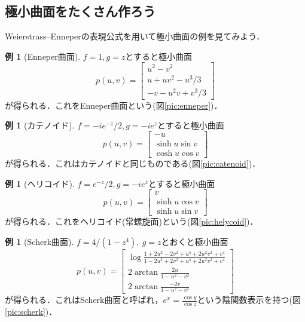 \documentclass[a4j]{ltjsarticle}
\numberwithin{equation}{section}
\theoremstyle{definition}
\newtheorem{eg}[thm]{例}
\begin{document}
\subsection{極小曲面をたくさん作ろう}
Weierstrass--Enneperの表現公式を用いて極小曲面の例を見てみよう．
\begin{eg}[Enneper曲面]
    $f=1,g=z$とすると極小曲面
    \begin{equation}
        p(u,v)=\begin{bmatrix}
            u^2-v^2\\
            u+uv^2-u^3/3\\
            -v-u^2v+v^3/3
        \end{bmatrix}
    \end{equation}
    が得られる．これをEnneper曲面という(図\ref{pic:enneper})．
\end{eg}
\begin{eg}[カテノイド]
    $f=-ie^{-z}/2,g=-ie^{z}$とすると極小曲面
    \begin{equation}
        p(u,v)=\begin{bmatrix}
            -u\\
            \sinh u \sin v\\
            \cosh u \cos v
        \end{bmatrix}
    \end{equation}
    が得られる．これはカテノイドと同じものである(図\ref{pic:catenoid})．
\end{eg}
\begin{eg}[ヘリコイド]
    $f=e^{-z}/2,g=-ie^{z}$とすると極小曲面 
    \begin{equation}
        p(u,v)=\begin{bmatrix}
            v\\
            \sinh u\cos v\\
            \sinh u\sin v 
        \end{bmatrix}
    \end{equation}
    が得られる．これをヘリコイド(常螺旋面)という(図\ref{pic:helycoid})．
\end{eg}
\begin{eg}[Scherk曲面]
    $f=4/(1-z^4),\ g=z$とおくと極小曲面
    \begin{equation}
        p(u,v)=\begin{bmatrix}
            \log\frac{1+2u^2-2v^2+u^4+2u^2v^2+v^4}{1-2u^2+2v^2+u^4+2u^2v^2+v^4}\\
            2\arctan\frac{2u}{1-u^2-v^2}\\
            2\arctan\frac{-2v}{1-u^2-v^2}
        \end{bmatrix}
    \end{equation}
    が得られる．これはScherk曲面と呼ばれ，$e^x=\frac{\cos y}{\cos z}$という陰関数表示を持つ(図\ref{pic:scherk})．
\end{eg}
\end{document}
